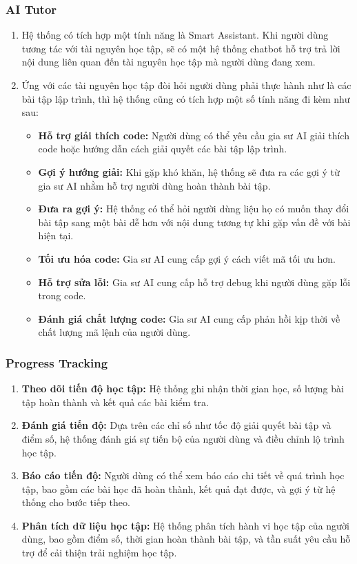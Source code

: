 \subsubsection{AI Tutor}
\begin{enumerate}
\item Hệ thống có tích hợp một tính năng là Smart Assistant. Khi người dùng tương tác với tài nguyên học tập, sẽ có một hệ thống chatbot hỗ trợ trả lời nội dung liên quan đến tài nguyên học tập mà người dùng đang xem.
\item Ứng với các tài nguyên học tập đòi hỏi người dùng phải thực hành như là các bài tập lập trình, thì hệ thống cũng có tích hợp một số tính năng đi kèm như sau:
\begin{itemize}
    \item \textbf{Hỗ trợ giải thích code:} Người dùng có thể yêu cầu gia sư AI giải thích code hoặc hướng dẫn cách giải quyết các bài tập lập trình.
    \item \textbf{Gợi ý hướng giải:} Khi gặp khó khăn, hệ thống sẽ đưa ra các gợi ý từ gia sư AI nhằm hỗ trợ người dùng hoàn thành bài tập.
    \item \textbf{Đưa ra gợi ý:} Hệ thống có thể hỏi người dùng liệu họ có muốn thay đổi bài tập sang một bài dễ hơn với nội dung tương tự khi gặp vấn đề với bài hiện tại.
    \item \textbf{Tối ưu hóa code:} Gia sư AI cung cấp gợi ý cách viết mã tối ưu hơn.
    \item \textbf{Hỗ trợ sửa lỗi:} Gia sư AI cung cấp hỗ trợ debug khi người dùng gặp lỗi trong code.
    \item \textbf{Đánh giá chất lượng code:} Gia sư AI cung cấp phản hồi kịp thời về chất lượng mã lệnh của người dùng.
\end{itemize}
\end{enumerate}
\subsubsection{Progress Tracking}
\begin{enumerate}
    \item \textbf{Theo dõi tiến độ học tập:} Hệ thống ghi nhận thời gian học, số lượng bài tập hoàn thành và kết quả các bài kiểm tra.
\item \textbf{Đánh giá tiến độ:} Dựa trên các chỉ số như tốc độ giải quyết bài tập và điểm số, hệ thống đánh giá sự tiến bộ của người dùng và điều chỉnh lộ trình học tập.
\item \textbf{Báo cáo tiến độ:} Người dùng có thể xem báo cáo chi tiết về quá trình học tập, bao gồm các bài học đã hoàn thành, kết quả đạt được, và gợi ý từ hệ thống cho bước tiếp theo.
\item \textbf{Phân tích dữ liệu học tập:} Hệ thống phân tích hành vi học tập của người dùng, bao gồm điểm số, thời gian hoàn thành bài tập, và tần suất yêu cầu hỗ trợ để cải thiện trải nghiệm học tập.
\end{enumerate}
